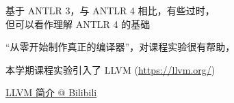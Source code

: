 \begin{frame}{}
  \begin{columns}
  \end{columns}

  \vspace{0.50cm}
  \begin{center}
    基于 ANTLR 3，与 ANTLR 4 相比，有些过时，\\[3pt]
    但可以看作理解 ANTLR 4 的基础
  \end{center}
\end{frame}

\begin{frame}{}
  \begin{center}
    ``从零开始制作真正的编译器''，对课程实验很有帮助，
  \end{center}
\end{frame}

\begin{frame}{}

  \begin{center}
    本学期课程实验引入了 LLVM (\url{https://llvm.org/})
  \end{center}
\end{frame}

\begin{frame}{}

  \vspace{0.20cm}
  \begin{center}
    \href{https://www.bilibili.com/video/BV1RF411K7F5/?vd_source=e3cbbf5ca80db268fa006d63626e267e}{LLVM 简介 @ Bilibili}
  \end{center}
\end{frame}
